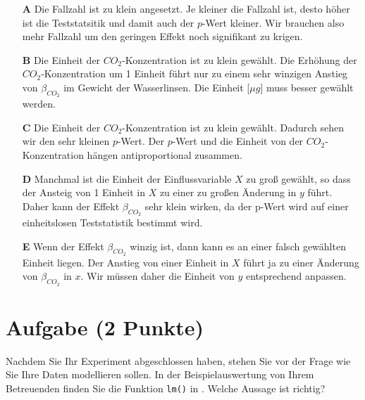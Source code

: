 \documentclass[a4paper, 9pt]{scrartcl}\usepackage[]{graphicx}\usepackage[]{xcolor}
\begin{document}
\begin{enumerate}
\item [\textbf{A} \msquare] Die Fallzahl ist zu klein angesetzt. Je kleiner die Fallzahl ist, desto höher ist die Teststatsitik und damit auch der $p$-Wert kleiner. Wir brauchen also mehr Fallzahl um den geringen Effekt noch signifikant zu krigen.
\item [\textbf{B} \msquare] Die Einheit der $CO_2$-Konzentration ist zu klein gewählt. Die Erhöhung der $CO_2$-Konzentration um 1 Einheit führt nur zu einem sehr winzigen Anstieg von $\beta_{CO_2}$ im Gewicht der Wasserlinsen. Die Einheit [$\mu g$] muss besser gewählt werden.
\item [\textbf{C} \msquare] Die Einheit der $CO_2$-Konzentration ist zu klein gewählt. Dadurch sehen wir den sehr kleinen $p$-Wert. Der $p$-Wert und die Einheit von der $CO_2$-Konzentration hängen antiproportional zusammen.
\item [\textbf{D} \msquare] Manchmal ist die Einheit der Einflussvariable $X$ zu groß gewählt, so dass der Ansteig von 1 Einheit in $X$ zu einer zu großen Änderung in $y$ führt. Daher kann der Effekt $\beta_{CO_2}$ sehr klein wirken, da der p-Wert wird auf einer einheitslosen Teststatistik bestimmt wird.
\item [\textbf{E} \msquare] Wenn der Effekt $\beta_{CO_2}$ winzig ist, dann kann es an einer falsch gewählten Einheit liegen. Der Anstieg von einer Einheit in $X$ führt ja zu einer Änderung von $\beta_{CO_2}$ in $x$. Wir müssen daher die Einheit von $y$ entsprechend anpassen.
\end{enumerate}

\section{Aufgabe \hfill (2 Punkte)}



Nachdem Sie Ihr Experiment abgeschlossen haben, stehen Sie vor der Frage wie Sie Ihre Daten modellieren sollen. In der Beispielauswertung von Ihrem Betreuenden finden Sie die Funktion \texttt{lm()} in \Rlogo. Welche Aussage ist richtig?
\end{document}
